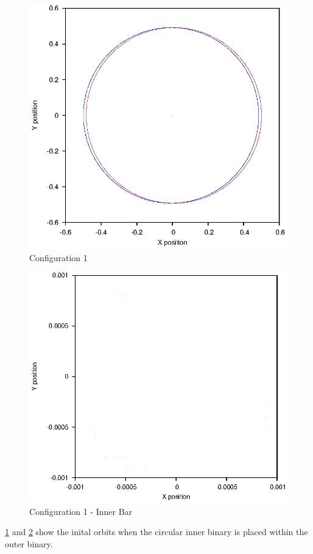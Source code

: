 \documentclass[a4paper,12pt]{article}
\begin{document}
\begin{figure}[H]
\centering
\includegraphics[width=.9\textwidth]{./2016results/stablebase/Orbit.eps}
\caption{Configuration 1}
\label{fig:config1}
\end{figure}
\begin{figure}[H]
\centering
\includegraphics[width=.9\textwidth]{./2016results/stablebase/Inner.eps}
\caption{Configuration 1 - Inner Bar}
\label{fig:config1i}
\end{figure}
\ref{fig:config1} and \ref{fig:config1i} show the inital orbits when the circular inner binary is placed within the outer binary.
\end{document}
